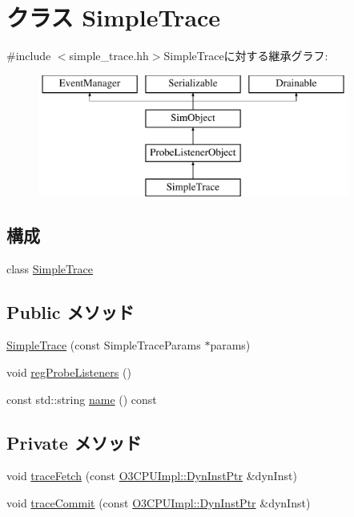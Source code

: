 \hypertarget{classSimpleTrace}{
\section{クラス SimpleTrace}
\label{classSimpleTrace}
}


{\ttfamily \#include $<$simple\_\-trace.hh$>$}SimpleTraceに対する継承グラフ:\begin{figure}[H]
\begin{center}
\leavevmode
\includegraphics[height=4cm]{classSimpleTrace}
\end{center}
\end{figure}
\subsection*{構成}
\begin{DoxyCompactItemize}
\item 
class \hyperlink{classSimpleTrace_1_1SimpleTrace}{SimpleTrace}
\end{DoxyCompactItemize}
\subsection*{Public メソッド}
\begin{DoxyCompactItemize}
\item 
\hyperlink{classSimpleTrace_a7ce7f197366d8c2bf9967cdcc0d418c1}{SimpleTrace} (const SimpleTraceParams $\ast$params)
\item 
void \hyperlink{classSimpleTrace_aa58a8221691801138d5d9236b8c3e0fb}{regProbeListeners} ()
\item 
const std::string \hyperlink{classSimpleTrace_a6490f765a824ced1cc94979609fe7e07}{name} () const 
\end{DoxyCompactItemize}
\subsection*{Private メソッド}
\begin{DoxyCompactItemize}
\item 
void \hyperlink{classSimpleTrace_acef17a0d15cdee9ac15c8aa760ec3070}{traceFetch} (const \hyperlink{classRefCountingPtr}{O3CPUImpl::DynInstPtr} \&dynInst)
\item 
void \hyperlink{classSimpleTrace_af37aacf101d574df0198e9d66bf9f024}{traceCommit} (const \hyperlink{classRefCountingPtr}{O3CPUImpl::DynInstPtr} \&dynInst)
\end{DoxyCompactItemize}


